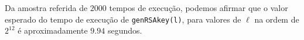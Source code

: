 \documentclass[dvipsnames]{article}
\begin{document}
\begin{multicols}{2}
  \vskip 0.2cm
  
  \noindent {}
  
  Da amostra referida de $2000$ tempos de execução, podemos afirmar que o valor esperado do tempo de execução de \texttt{genRSAkey(l)}, para valores de $\ell$ na ordem de $2^{12}$ é aproximadamente $9.94$ segundos.

  
  
  
\end{multicols}
\end{document}
